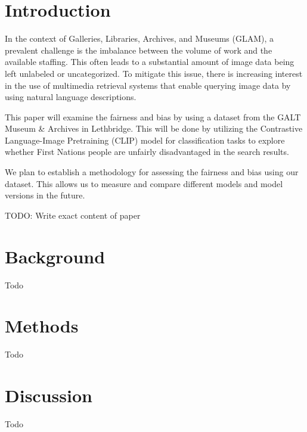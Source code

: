 \documentclass[12pt,a4paper,titlepage,oneside,english]{article}
\begin{document}
\section{Introduction}



In the context of Galleries, Libraries, Archives, and Museums (GLAM), a prevalent challenge is the imbalance between the volume of work and the available staffing. This often leads to a substantial amount of image data being left unlabeled or uncategorized. To mitigate this issue, there is increasing interest in the use of multimedia retrieval systems that enable querying image data by using natural language descriptions. 

This paper will examine the fairness and bias by using a dataset from the GALT Museum \& Archives in Lethbridge. This will be done by utilizing the Contrastive Language-Image Pretraining (CLIP) model for classification tasks to explore whether First Nations people are unfairly disadvantaged in the search results.

We plan to establish a methodology for assessing the fairness and bias using our dataset. This allows us to measure and compare different models and model versions in the future. 

TODO: Write exact content of paper


\section{Background}

Todo

\section{Methods}

Todo

\section{Discussion}

Todo

\newpage
\setcounter{page}{1}
\onehalfspacing
{}


\end{document}
